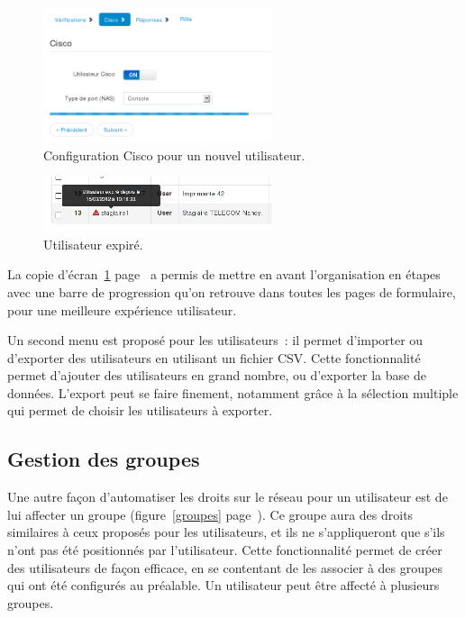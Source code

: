\begin{figure}[!h]
	\begin{center}
	    \includegraphics[width=0.6\textwidth]{img/userscisco.png}
	\end{center}
	\caption{Configuration Cisco pour un nouvel utilisateur.}
	\label{userscisco}
\end{figure}

\begin{figure}[!h]
	\begin{center}
	    \includegraphics[width=0.6\textwidth]{img/usersexp.png}
	\end{center}
	\caption{Utilisateur expiré.}
	\label{usersexp}
\end{figure}

La copie d'écran~\ref{userscisco} page~\pageref{userscisco} a permis de mettre en avant l'organisation en étapes avec une barre de progression qu'on retrouve dans toutes les pages de formulaire, pour une meilleure expérience utilisateur.

Un second menu est proposé pour les utilisateurs~: il permet d'importer ou d'exporter des utilisateurs en utilisant un fichier CSV. Cette fonctionnalité permet d'ajouter des utilisateurs en grand nombre, ou d'exporter la base de données. L'export peut se faire finement, notamment grâce à la sélection multiple qui permet de choisir les utilisateurs à exporter.

\subsection{Gestion des groupes}

Une autre façon d'automatiser les droits sur le réseau pour un utilisateur est de lui affecter un groupe (figure~\ref{groupes} page~\pageref{groupes}). Ce groupe aura des droits similaires à ceux proposés pour les utilisateurs, et ils ne s'appliqueront que s'ils n'ont pas été positionnés par l'utilisateur. Cette fonctionnalité permet de créer des utilisateurs de façon efficace, en se contentant de les associer à des groupes qui ont été configurés au préalable. Un utilisateur peut être affecté à plusieurs groupes.

